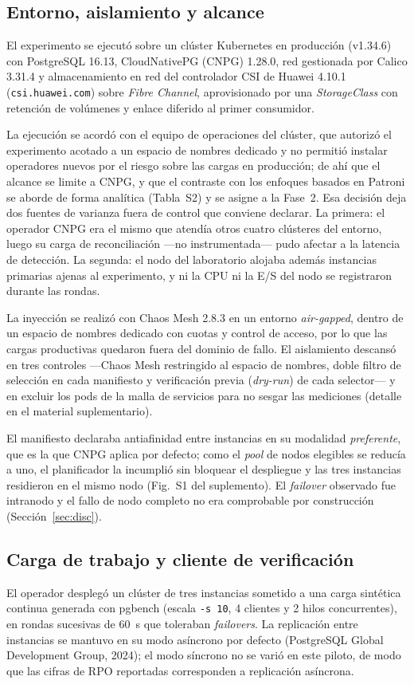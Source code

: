 \documentclass[12pt,twocolumn,letterpaper]{article}
\begin{document}
\subsection{Entorno, aislamiento y alcance}\label{sec:entorno}
El experimento se ejecutó sobre un clúster Kubernetes en producción (v1.34.6) con PostgreSQL 16.13, CloudNativePG (CNPG) 1.28.0, red gestionada por Calico 3.31.4 y almacenamiento en red del controlador CSI de Huawei 4.10.1 (\texttt{csi.huawei.com}) sobre \textit{Fibre Channel}, aprovisionado por una \textit{StorageClass} con retención de volúmenes y enlace diferido al primer consumidor.

La ejecución se acordó con el equipo de operaciones del clúster, que autorizó el experimento acotado a un espacio de nombres dedicado y no permitió instalar operadores nuevos por el riesgo sobre las cargas en producción; de ahí que el alcance se limite a CNPG, y que el contraste con los enfoques basados en Patroni se aborde de forma analítica (Tabla~S2) y se asigne a la Fase~2. Esa decisión deja dos fuentes de varianza fuera de control que conviene declarar. La primera: el operador CNPG era el mismo que atendía otros cuatro clústeres del entorno, luego su carga de reconciliación —no instrumentada— pudo afectar a la latencia de detección. La segunda: el nodo del laboratorio alojaba además instancias primarias ajenas al experimento, y ni la CPU ni la E/S del nodo se registraron durante las rondas.

La inyección se realizó con Chaos Mesh 2.8.3 en un entorno \textit{air-gapped}, dentro de un espacio de nombres dedicado con cuotas y control de acceso, por lo que las cargas productivas quedaron fuera del dominio de fallo. El aislamiento descansó en tres controles —Chaos Mesh restringido al espacio de nombres, doble filtro de selección en cada manifiesto y verificación previa (\textit{dry-run}) de cada selector— y en excluir los pods de la malla de servicios para no sesgar las mediciones (detalle en el material suplementario).

El manifiesto declaraba antiafinidad entre instancias en su modalidad \emph{preferente}, que es la que CNPG aplica por defecto; como el \textit{pool} de nodos elegibles se reducía a uno, el planificador la incumplió sin bloquear el despliegue y las tres instancias residieron en el mismo nodo (Fig.~S1 del suplemento). El \textit{failover} observado fue intranodo y el fallo de nodo completo no era comprobable por construcción (Sección~\ref{sec:disc}).


\subsection{Carga de trabajo y cliente de verificación}\label{sec:carga}
El operador desplegó un clúster de tres instancias sometido a una carga sintética continua generada con pgbench (escala \texttt{-s 10}, 4 clientes y 2 hilos concurrentes), en rondas sucesivas de 60~s que toleraban \textit{failovers}. La replicación entre instancias se mantuvo en su modo asíncrono por defecto (PostgreSQL Global Development Group, 2024); el modo síncrono no se varió en este piloto, de modo que las cifras de RPO reportadas corresponden a replicación asíncrona.
\end{document}
